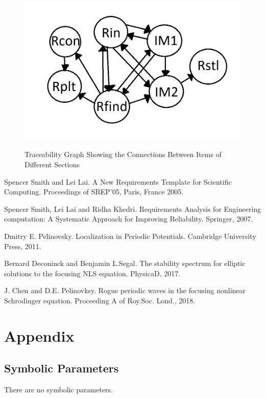 \documentclass[12pt]{article}
\begin{document}
\begin{figure}[h!]
	\begin{center}
		{
			\includegraphics[width=\textwidth]{RTrace.png}
		}
 		\caption{\label{Fig_RTrace} Traceability Graph Showing the Connections 
 			Between Items of Different Sections}
	\end{center}
\end{figure}




\newpage
\begin{thebibliography}{9}
	Spencer Smith and Lei Lai. 
	A New Requirements Template for Scientific Computing. 
	Proceedings of SREP'05, Paris, France 2005. 
	
	Spencer Smith, Lei Lai and Ridha Khedri. 
	Requirements Analysis for Engineering computation: A Systematic Approach 
	for Improving Reliability. 
	Springer, 2007. 
	
	Dmitry E. Pelinovsky. 
	Localization in Periodic Potentials. 
	Cambridge University Press, 2011. 
	
	Bernard Deconinck and Benjamin L.Segal. 
	The stability spectrum for elliptic solutions to the focusing NLS equation. 
	PhysicaD, 2017.  
	
	J. Chen and D.E. Pelinovksy. 
	Rogue periodic waves in the focusing nonlinear Schrodinger equation. 
	Proceeding A of Roy.Soc. Lond., 2018. 
	
\end{thebibliography} 

\newpage

\section{Appendix}

\subsection{Symbolic Parameters}

There are no symbolic parameters.
\end{document}

